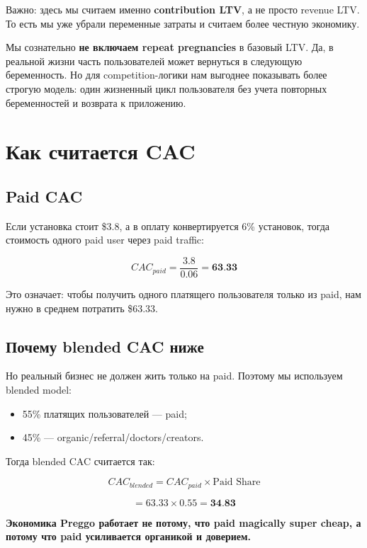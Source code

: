 \documentclass[10pt,a4paper]{article}
\newcommand{\bluequote}[1]{%
\begin{tcolorbox}[
    enhanced,
    breakable,
    colback=brandblush,
    colframe=brandcoraldeep,
    boxrule=0.85pt,
    arc=3pt,
    left=8pt,right=8pt,top=6pt,bottom=6pt
]
#1
\end{tcolorbox}
}
\begin{document}
Важно: здесь мы считаем именно \textbf{contribution LTV}, а не просто revenue LTV.  
То есть мы уже убрали переменные затраты и считаем более честную экономику.

\begin{orangebox}
Мы сознательно \textbf{не включаем repeat pregnancies} в базовый LTV. Да, в реальной жизни часть пользователей может вернуться в следующую беременность. Но для competition-логики нам выгоднее показывать более строгую модель: один жизненный цикл пользователя без учета повторных беременностей и возврата к приложению.
\end{orangebox}

\section{Как считается CAC}

\subsection{Paid CAC}

Если установка стоит \$3.8, а в оплату конвертируется 6\% установок, тогда стоимость одного paid user через paid traffic:

\[
CAC_{paid} = \frac{3.8}{0.06} = \textbf{63.33}
\]

Это означает:  
чтобы получить одного платящего пользователя только из paid, нам нужно в среднем потратить \$63.33.

\subsection{Почему blended CAC ниже}

Но реальный бизнес не должен жить только на paid.  
Поэтому мы используем blended model:

\begin{itemize}
    \item 55\% платящих пользователей --- paid;
    \item 45\% --- organic/referral/doctors/creators.
\end{itemize}

Тогда blended CAC считается так:

\[
CAC_{blended} = CAC_{paid} \times \text{Paid Share}
\]

\[
= 63.33 \times 0.55 = \textbf{34.83}
\]

\bluequote{\textbf{Экономика Preggo работает не потому, что paid magically super cheap, а потому что paid усиливается органикой и доверием.}}
\end{document}
